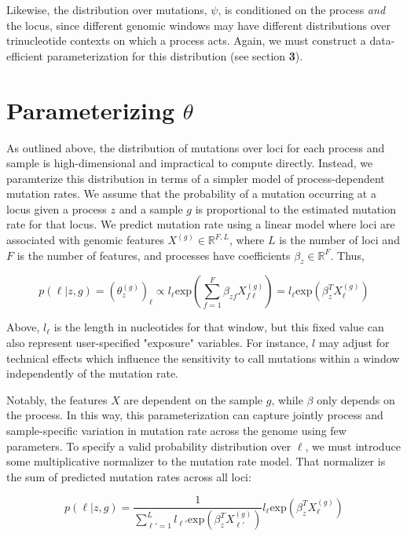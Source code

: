 \documentclass{article}
\begin{document}
Likewise, the distribution over mutations, $\psi$, is conditioned on the process \emph{and} the locus, since different genomic windows may have different 
distributions over trinucleotide contexts on which a process acts. Again, we must construct a data-efficient parameterization for this distribution (see section \textbf{3}).


\section{Parameterizing $\theta$}

As outlined above, the distribution of mutations over loci for each process and sample is high-dimensional and impractical to compute directly. Instead, we paramterize this
distribution in terms of a simpler model of process-dependent mutation rates. We assume that the probability of a mutation occurring at a locus given a process $z$ and a sample $g$ is proportional to the estimated mutation rate for that locus. We predict mutation rate using a linear model where loci are associated with genomic features $X^{(g)} \in \mathbb{R}^{F,L}$, where $L$ is the number of loci and $F$ is the number of features, and processes have coefficients $\beta_z \in \mathbb{R}^{F}$. Thus, 

\begin{equation} \label{3}
p(\ell | z, g) = (\theta_z^{(g)})_\ell \propto l_\ell  \textrm{exp}(\sum_{f=1}^{F}\beta_{zf} X^{(g)}_{f\ell}) = l_\ell \textrm{exp}(\beta_z^T X^{(g)}_\ell)
\end{equation}

Above, $l_\ell$ is the length in nucleotides for that window, but this fixed value can also represent user-specified "exposure" variables. For instance, $l$ may adjust for technical effects which influence the sensitivity to call mutations within a window independently of the mutation rate.

Notably, the features $X$ are dependent on the sample $g$, while $\beta$ only depends on the process. In this way, this parameterization can capture jointly process and sample-specific variation in mutation rate across the genome using few parameters. To specify a valid probability distribution over $\ell$, we must introduce some multiplicative normalizer to the mutation rate model. That normalizer is the sum of predicted mutation rates across all loci:

\begin{equation}
p(\ell | z, g) = \frac{1}{\sum_{\ell'=1}^L l_{\ell'} \textrm{exp}(\beta_z^T X^{(g)}_{\ell'})} l_\ell \textrm{exp}(\beta_z^T X^{(g)}_\ell)
\end{equation}
\end{document}

